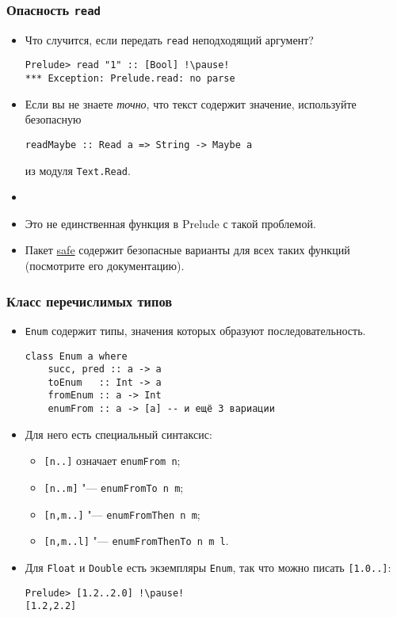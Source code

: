 \documentclass[10pt]{beamer}
\begin{document}
\begin{frame}[fragile]
\frametitle{Опасность \lstinline|read|}
\begin{itemize}
    \item Что случится, если передать \lstinline|read| неподходящий аргумент?
\begin{lstlisting}
Prelude> read "1" :: [Bool] !\pause!
*** Exception: Prelude.read: no parse
\end{lstlisting}
    \item Если вы не знаете \emph{точно}, что текст содержит значение, используйте безопасную
\begin{lstlisting}
readMaybe :: Read a => String -> Maybe a
\end{lstlisting}
    из модуля \lstinline|Text.Read|.
    \pause
    \item[]
    \item Это не единственная функция в Prelude с такой проблемой.
    \item Пакет \href{https://hackage.haskell.org/package/safe}{safe} содержит безопасные варианты для всех таких функций (посмотрите его документацию).
    \end{itemize}
\end{frame}

\begin{frame}[fragile]
\frametitle{Класс перечислимых типов}
\begin{itemize}
    \item 
    \lstinline|Enum| содержит типы, значения которых образуют последовательность.
\begin{lstlisting}
class Enum a where
    succ, pred :: a -> a
    toEnum   :: Int -> a
    fromEnum :: a -> Int
    enumFrom :: a -> [a] -- и ещё 3 вариации
\end{lstlisting}
    \pause
    \item Для него есть специальный синтаксис: 
    \begin{itemize}
        \item \lstinline|[n..]| означает \lstinline|enumFrom n|;
        \item \lstinline|[n..m]| "--- \lstinline|enumFromTo n m|;
        \item \lstinline|[n,m..]| "--- \lstinline|enumFromThen n m|;
        \item \lstinline|[n,m..l]| "--- \lstinline|enumFromThenTo n m l|.
    \end{itemize}
    \pause
    \item Для \lstinline|Float| и \lstinline|Double| есть экземпляры \lstinline|Enum|, так что можно писать \lstinline|[1.0..]|: 
\begin{lstlisting}
Prelude> [1.2..2.0] !\pause!
[1.2,2.2]
\end{lstlisting}
\end{itemize}
\end{frame}
\end{document}
